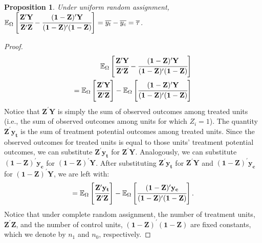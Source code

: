 \documentclass[12pt,leqno]{article}
\theoremstyle{newstyle}
\newtheorem{prop}[thm]{Proposition}
\begin{document}
\begin{prop} \label{prop: complete ran assign}
Under uniform random assignment, $\mathbb{E}_{\Omega} \left[\cfrac{\mathbf{Z}^{\prime}\mathbf{Y}}{\mathbf{Z}^{\prime}\mathbf{Z}} - \cfrac{(\mathbf{1} - \mathbf{Z})^{\prime} \mathbf{Y}}{(\mathbf{1} - \mathbf{Z})^{\prime}(\mathbf{1} - \mathbf{Z})}\right] = \overline{y_{t}} - \overline{y_{c}} = \overline{\tau}$.
\end{prop}
\begin{proof}
\begin{align*}
\mathbb{E}_{\Omega} \left[\cfrac{\mathbf{Z}^{\prime}\mathbf{Y}}{\mathbf{Z}^{\prime}\mathbf{Z}} - \cfrac{(\mathbf{1} - \mathbf{Z})^{\prime} \mathbf{Y}}{(\mathbf{1} - \mathbf{Z})^{\prime}(\mathbf{1} - \mathbf{Z})}\right] \\
= \mathbb{E}_{\Omega} \left[\cfrac{\mathbf{Z}^{\prime}\mathbf{Y}}{\mathbf{Z}^{\prime}\mathbf{Z}}\right] - \mathbb{E}_{\Omega}\left[\cfrac{(\mathbf{1} - \mathbf{Z})^{\prime} \mathbf{Y}}{(\mathbf{1} - \mathbf{Z})^{\prime}(\mathbf{1} - \mathbf{Z})}\right] \\
\end{align*}
Notice that $\mathbf{Z}^{\prime}\mathbf{Y}$ is simply the sum of observed outcomes among treated units (i.e., the sum of observed outcomes among units for which $Z_i = 1$). The quantity $\mathbf{Z}^{\prime}\mathbf{y_t}$ is the sum of treatment potential outcomes among treated units. Since the observed outcomes for treated units is equal to those units' treatment potential outcomes, we can substitute $\mathbf{Z}^{\prime}\mathbf{y_t}$ for $\mathbf{Z}^{\prime}\mathbf{Y}$. Analogously, we can substitute $\left(\mathbf{1} - \mathbf{Z}\right)^{\prime}\mathbf{y_c}$ for $\left(\mathbf{1} - \mathbf{Z}\right)^{\prime}\mathbf{Y}$. After substituting $\mathbf{Z}^{\prime}\mathbf{y_t}$ for $\mathbf{Z}^{\prime}\mathbf{Y}$ and $\left(\mathbf{1} - \mathbf{Z}\right)^{\prime}\mathbf{y_c}$ for $\left(\mathbf{1} - \mathbf{Z}\right)^{\prime}\mathbf{Y}$, we are left with:
\begin{align*}
= \mathbb{E}_{\Omega} \left[\cfrac{\mathbf{Z}^{\prime} \mathbf{y_t}}{\mathbf{Z}^{\prime}\mathbf{Z}}\right] - \mathbb{E}_{\Omega}\left[\cfrac{(\mathbf{1} - \mathbf{Z})^{\prime} \mathbf{y_c}}{(\mathbf{1} - \mathbf{Z})^{\prime}(\mathbf{1} - \mathbf{Z})}\right].
\end{align*}
Notice that under complete random assignment, the number of treatment units, $\mathbf{Z}^{\prime}\mathbf{Z}$, and the number of control units, $\left(\mathbf{1} - \mathbf{Z}\right)^{\prime}\left(\mathbf{1} - \mathbf{Z}\right)$ are fixed constants, which we denote by $n_1$ and $n_0$, respectively.

\end{proof}
\end{document}
